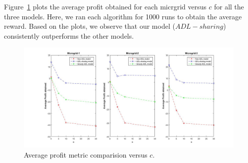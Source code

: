Figure~\ref{r1} plots the average profit obtained for each micrgrid versus $c$ for all the three models. Here, we ran each algorithm for 1000 runs to obtain the average reward. Based on the plots, we observe that our model ($ADL-sharing$) consistently outperforms the other models.  
\begin{figure}[thbp]
	\centering
	\includegraphics[scale = 0.2]{first_plot.jpg}
	\caption{Average profit metric comparision versus $c$.}
	 \label{r1}
\end{figure}
